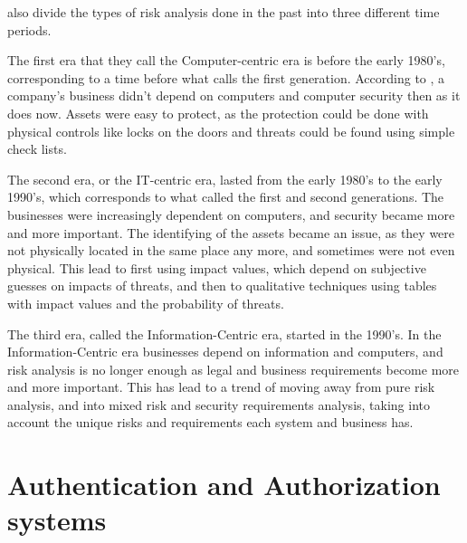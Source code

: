 \citet{risk_analysis_to_security_requirements} also divide the types of risk analysis done in the past into three different time periods.

The first era that they call the Computer-centric era is before the early 1980's, corresponding to a time before what \citet{threat_analysis_1993} calls the first generation.
According to \citet{risk_analysis_to_security_requirements}, a company's business didn't depend on computers and computer security then as it does now.
Assets were easy to protect, as the protection could be done with physical controls like locks on the doors and threats could be found using simple check lists.

The second era, or the IT-centric era, lasted from the early 1980's to the early 1990's, which corresponds to what \citep{threat_analysis_1993} called the first and second generations.
The businesses were increasingly dependent on computers, and security became more and more important.
The identifying of the assets became an issue, as they were not physically located in the same place any more, and sometimes were not even physical.
This lead to first using impact values, which depend on subjective guesses on impacts of threats, and then to qualitative techniques using tables with impact values and the probability of threats. \citet{risk_analysis_to_security_requirements}

The third era, called the Information-Centric era, started in the 1990's.
In the Information-Centric era businesses depend on information and computers, and risk analysis is no longer enough as legal and business requirements become more and more important.
This has lead to a trend of moving away from pure risk analysis, and into mixed risk and security requirements analysis, taking into account the unique risks and requirements each system and business has. \citet{risk_analysis_to_security_requirements}

\newpage

\section{Authentication and Authorization systems}

